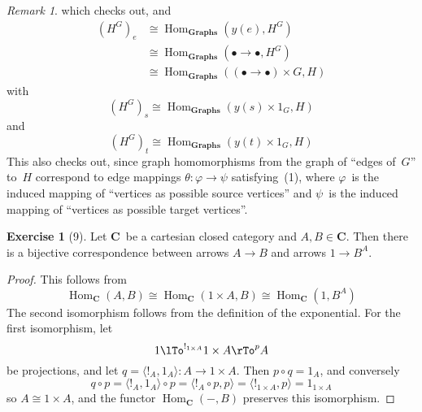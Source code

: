 \documentclass[letterpaper,12pt]{article}
\newcommand{\vertex}{\bullet}
\newcommand{\iso}{\cong}
\newcommand{\edge}{\rightarrow}
\newcommand{\after}{\circ}
\newcommand{\term}{{!}}
\DeclareMathOperator{\Hom}{Hom}
\newcommand{\pair}[2]{\langle{#1},{#2}\rangle}
\newcommand{\cat}[1]{\mathbf{#1}}
\newcommand{\2}{\cat{2}}
\newcommand{\C}{\cat{C}}
\newcommand{\Grph}{\cat{Graphs}}
\theoremstyle{definition}
\newtheorem*{exer}{Exercise}
\theoremstyle{remark}
\newtheorem*{rmk}{Remark}
\theoremstyle{direction}
\begin{document}
\begin{rmk}
which checks out, and
\begin{align*}
(H^G)_e&\iso\Hom_{\Grph}(y(e),H^G)\\
	&\iso\Hom_{\Grph}(\vertex\edge\vertex,H^G)\\
	&\iso\Hom_{\Grph}((\vertex\edge\vertex)\times G,H)
\end{align*}
with
\[(H^G)_s\iso\Hom_{\Grph}(y(s)\times 1_G,H)\]
and
\[(H^G)_t\iso\Hom_{\Grph}(y(t)\times 1_G,H)\]
This also checks out, since graph homomorphisms from the graph of ``edges of~\(G\)'' to~\(H\) correspond to edge mappings \(\theta:\varphi\to\psi\) satisfying~(1), where \(\varphi\)~is the induced mapping of ``vertices as possible source vertices'' and \(\psi\)~is the induced mapping of ``vertices as possible target vertices''.
\end{rmk}

\begin{exer}[9]
Let \(\C\)~be a cartesian closed category and \(A,B\in\C\). Then there is a bijective correspondence between arrows \(A\to B\) and arrows \(1\to B^A\).
\end{exer}
\begin{proof}
This follows from
\[\Hom_{\C}(A,B)\iso\Hom_{\C}(1\times A,B)\iso\Hom_{\C}(1,B^A)\]
The second isomorphism follows from the definition of the exponential. For the first isomorphism, let
\[1\lTo^{\term_{1\times A}}1\times A\rTo^p A\]
be projections, and let \(q=\pair{\term_A}{1_A}:A\to1\times A\). Then \(p\after q=1_A\), and conversely
\[q\after p=\pair{\term_A}{1_A}\after p=\pair{\term_A\after p}{p}=\pair{\term_{1\times A}}{p}=1_{1\times A}\]
so \(A\iso 1\times A\), and the functor \(\Hom_{\C}(-,B)\) preserves this isomorphism.
\end{proof}
\end{document}
